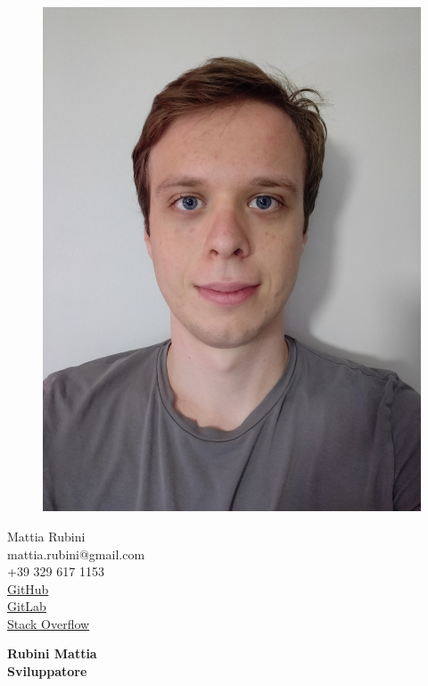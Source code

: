 \documentclass[a4paper,12pt,final]{memoir}
\begin{document}
\begin{figure}
	\hfill
	\includegraphics[width=1\columnwidth, angle=90]{photo-Mattia}
	\vspace{-7cm}
\end{figure}

\begin{flushright}\small
	Mattia Rubini \\
	mattia.rubini@gmail.com \\
	+39 329 617 1153 \\
	\href{https://github.com/Mot93}{GitHub}\\
	\href{https://gitlab.com/mattia.rubini}{GitLab}\\
	\href{https://stackoverflow.com/users/6875945/mattia-rubini}{Stack Overflow}
\end{flushright}\normalsize
\framebreak


\Huge\bfseries {\color{RoyalBlue} Rubini Mattia} \\
\Large\bfseries  Sviluppatore \\
\end{document}
